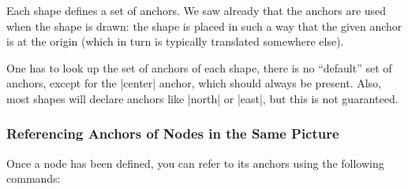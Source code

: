 Each shape defines a set of anchors. We saw already that the anchors
are used when the shape is drawn: the shape is placed in such a way
that the given anchor is at the origin (which in turn is typically
translated somewhere else).

One has to look up the set of anchors of each shape, there is no
``default'' set of anchors, except for the |center| anchor, which
should always be present. Also, most shapes will declare anchors like
|north| or |east|, but this is not guaranteed.


\subsubsection{Referencing Anchors of Nodes in the Same Picture}

Once a node has been defined, you can refer to its anchors using the
following commands:

